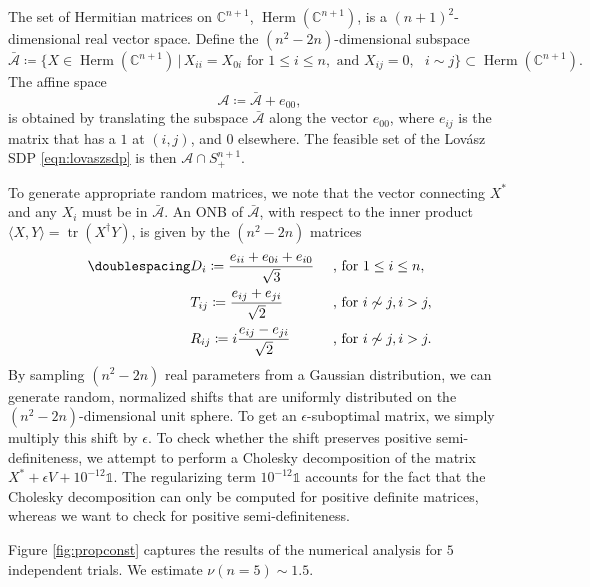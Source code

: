 The set of Hermitian matrices on $\mathbb{C}^{n+1}$, $\operatorname{Herm}(\mathbb{C}^{n+1})$, is a $(n+1)^2$-dimensional real vector space.
Define the $(n^2-2n)$-dimensional subspace
\begin{equation*}
\bar{\mathcal{A}}\coloneqq \{X\in\operatorname{Herm}(\mathbb{C}^{n+1}) \, \vert \, X_{ii}=X_{0i} \text{ for } 1\leq i \leq n, \text{ and } X_{ij}=0,\text{ } i\sim j\}\subset{\operatorname{Herm}(\mathbb{C}^{n+1})}.
\end{equation*}
The affine space
\begin{equation*}
\mathcal{A}\coloneqq \bar{\mathcal{A}}+e_{00},
\end{equation*}
is obtained by translating the subspace $\bar{\mathcal{A}}$ along the vector $e_{00}$, where $e_{ij}$ is the matrix that has a $1$ at $(i,j)$, and $0$ elsewhere. The feasible set of the Lovász SDP \ref{eqn:lovaszsdp} is then $\mathcal{A}\cap S_{+}^{n+1}$.

To generate appropriate random matrices, we note that the vector connecting $X^{*}$ and any $X_i$ must be in $\bar{\mathcal{A}}$. An ONB of $\bar{\mathcal{A}}$, with respect to the inner product $\langle X,Y\rangle=\operatorname{tr}(X^{\dag}Y)$, is given by the $(n^2-2n)$ matrices
\begin{alignat*}{2}
\doublespacing
& D_i \coloneqq \frac{e_{ii}+e_{0i}+e_{i0}}{\sqrt{3}}&& \text{ , for } 1\leq i\leq n,\\
& T_{ij} \coloneqq \frac{e_{ij}+e_{ji}}{\sqrt{2}}  && \text{ , for } i \not\sim j, i>j,\\
& R_{ij} \coloneqq i\frac{e_{ij}-e_{ji}}{\sqrt{2}} && \text{ , for } i\not\sim j, i>j.
\end{alignat*}
\onehalfspacing
By sampling $(n^2-2n)$ real parameters from a Gaussian distribution, we can generate random, normalized shifts that are uniformly distributed on the $(n^2-2n)$-dimensional unit sphere. To get an $\epsilon$-suboptimal matrix, we simply multiply this shift by $\epsilon$. To check whether the shift preserves positive semi-definiteness, we attempt to perform a Cholesky decomposition of the matrix $X^{*}+\epsilon V+10^{-12}\mathbb{1}$. The regularizing term $10^{-12}\mathbb{1}$ accounts for the fact that the Cholesky decomposition can only be computed for positive definite matrices, whereas we want to check for positive semi-definiteness.

Figure \ref{fig:propconst} captures the results of the numerical analysis for $5$ independent trials. We estimate $\nu(n=5)\sim 1.5$.

